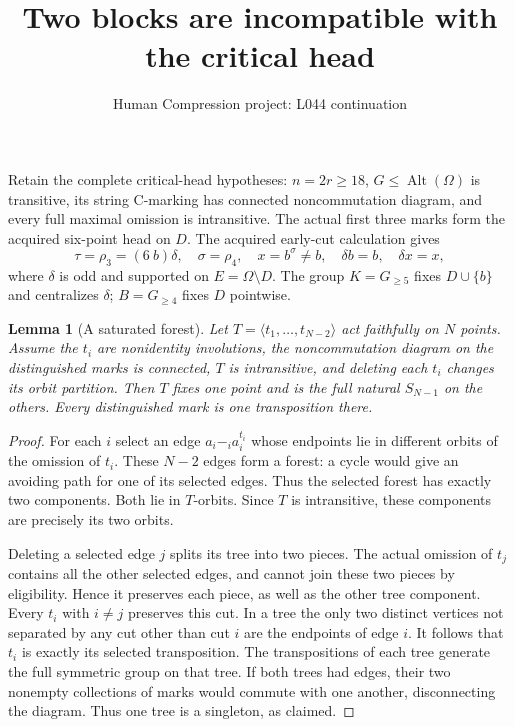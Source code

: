 \documentclass[11pt,a4paper]{article}
\title{Two blocks are incompatible with the critical head}
\author{Human Compression project: L044 continuation}
\date{}
\newtheorem{lemma}{Lemma}
\newcommand{\gen}[1]{\langle#1\rangle}
\begin{document}
\maketitle
Retain the complete critical-head hypotheses: $n=2r\ge18$,
$G\le\operatorname{Alt}(\Omega)$ is transitive, its string C-marking
has connected noncommutation diagram, and every full maximal omission
is intransitive. The actual first three marks form the acquired
six-point head on $D$. The acquired early-cut calculation gives
\[
 \tau=\rho_3=(6\ b)\delta,\quad \sigma=\rho_4,\quad
 x=b^\sigma\ne b,\quad \delta b=b,\quad\delta x=x,
\]
where $\delta$ is odd and supported on $E=\Omega\setminus D$.
The group $K=G_{\ge5}$ fixes $D\cup\{b\}$ and centralizes
$\delta$; $B=G_{\ge4}$ fixes $D$ pointwise.

\begin{lemma}[A saturated forest]
\label{forest}
Let $T=\gen{t_1,\ldots,t_{N-2}}$ act faithfully on $N$ points.
Assume the $t_i$ are nonidentity involutions, the noncommutation
 diagram on the distinguished marks is connected, $T$ is
intransitive, and deleting each $t_i$ changes its orbit partition.
Then $T$ fixes one point and is the full natural $S_{N-1}$ on
the others. Every distinguished mark is one transposition there.
\end{lemma}
\begin{proof}
For each $i$ select an edge $a_i\mathrel{-_{i}}a_i^{t_i}$
whose endpoints lie in different orbits of the omission of $t_i$.
These $N-2$ edges form a forest: a cycle would give an avoiding
path for one of its selected edges. Thus the selected forest has
exactly two components. Both lie in $T$-orbits. Since $T$ is
intransitive, these components are precisely its two orbits.

Deleting a selected edge $j$ splits its tree into two pieces.
The actual omission of $t_j$ contains all the other selected
edges, and cannot join these two pieces by eligibility. Hence
it preserves each piece, as well as the other tree component.
Every $t_i$ with $i\ne j$ preserves this cut. In a tree the
only two distinct vertices not separated by any cut other than
cut $i$ are the endpoints of edge $i$. It follows that $t_i$
is exactly its selected transposition. The transpositions of
each tree generate the full symmetric group on that tree.
If both trees had edges, their two nonempty collections of
marks would commute with one another, disconnecting the diagram.
Thus one tree is a singleton, as claimed.
\end{proof}
\end{document}
